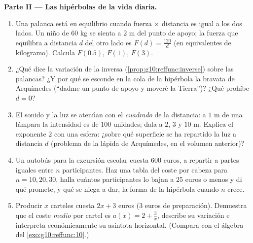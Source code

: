 \begin{problem}
\medskip
\noindent\textbf{Parte II --- Las hipérbolas de la vida diaria.}
\begin{enumerate}[resume]
  \item Una palanca está en equilibrio cuando fuerza $\times$ distancia es
        igual a los dos lados. Un niño de $60$ kg se sienta a $2$ m del
        punto de apoyo; la fuerza que equilibra a distancia $d$ del otro
        lado es $F(d) = \frac{120}{d}$ (en equivalentes de kilogramo).
        Calcula $F(0.5)$, $F(1)$, $F(3)$.
  \item ¿Qué dice la variación de la  inversa
        (\cref{prop:g10:reffunc:inverse}) sobre las palancas? ¿Y por qué
        se esconde en la cola de la hipérbola la bravata de Arquímedes
        (``dadme un punto de apoyo y moveré la Tierra'')? ¿Qué prohíbe
        $d = 0$?
  \item El sonido y la luz se atenúan con el \emph{cuadrado} de la
        distancia: a $1$ m de una lámpara la intensidad es de $100$
        unidades; dala a $2$, $3$ y $10$ m. Explica el exponente $2$ con
        una esfera: ¿sobre qué superficie se ha repartido la luz a
        distancia $d$ (problema de la lápida de Arquímedes, en el volumen
        anterior)?
  \item Un autobús para la excursión escolar cuesta $600$ euros, a
        repartir a partes iguales entre $n$ participantes. Haz una tabla
        del coste por cabeza para $n = 10, 20, 30$, halla cuántos
        participantes lo bajan a $25$ euros o menos y di qué promete, y
        qué se niega a dar, la forma de la hipérbola cuando $n$ crece.
  \item Producir $x$ carteles cuesta $2x + 3$ euros ($3$ euros de
        preparación). Demuestra que el coste \emph{medio} por cartel es
        $a(x) = 2 + \frac3x$, describe su variación e interpreta
        económicamente su asíntota horizontal. (Compara con el álgebra del
        \cref{exo:g10:reffunc:10}.)
\end{enumerate}


\end{problem}
